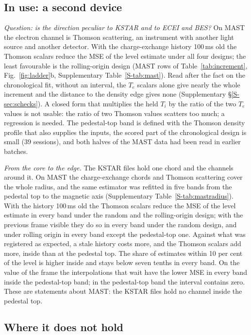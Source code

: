 \documentclass[11pt,a4paper]{article}
\newcommand{\Ti}{\ensuremath{T_i}}
\newcommand{\Te}{\ensuremath{T_e}}
\newcommand{\Supp}[1]{Supplementary \S\ref{S-#1}}
\newcommand{\SuppTab}[1]{Supplementary Table~\ref{S-#1}}
\begin{document}
\subsection{In use: a second device}
\label{sec:res:mast}

\emph{Question: is the direction peculiar to KSTAR and to ECEI and BES?} On MAST the
electron channel is Thomson scattering, an instrument with another light source and
another detector. With the charge-exchange history 100\,ms old the Thomson scalars reduce
the MSE of the level estimate under all four designs; the least favourable is the
rolling-origin design (MAST rows of Table~\ref{tab:increment}, Fig.~\ref{fig:ladder}b,
\SuppTab{tab:mast}). Read after the fact on the chronological fit, without an interval,
the \Te{} scalars alone give nearly the whole increment and the distance to the density
edge gives none (\Supp{sec:schecks}). A closed form that multiplies the held \Ti{} by the
ratio of the two \Te{} values is not usable: the ratio of two Thomson values scatters too
much; a regression is needed. The pedestal-top band is defined with the Thomson density
profile that also supplies the inputs, the scored part of the chronological design is
small (39 sessions), and both halves of the MAST data had been read in earlier batches.

\emph{From the core to the edge.} The KSTAR files hold one chord and the channels around
it. On MAST the charge-exchange chords and Thomson scattering cover the whole radius, and
the same estimator was refitted in five bands from the pedestal top to the magnetic axis
(\SuppTab{tab:mastradius}). With the history 100\,ms old the Thomson scalars reduce the MSE
of the level estimate in every band under the random and the rolling-origin design; with
the previous frame visible they do so in every band under the random design, and under
rolling origin in every band except the pedestal-top one. Against what was registered as
expected, a stale history costs more, and the Thomson scalars add more, inside than at the
pedestal top. The share of estimates within 10 per cent of the level is higher inside and
stays below seven tenths in every band. On the value of the frame the interpolations that
wait have the lower MSE in every band inside the pedestal-top band; in the pedestal-top
band the interval contains zero. These are statements about MAST: the KSTAR files hold no
channel inside the pedestal top.

\subsection{Where it does not hold}
\label{sec:res:limits}
\end{document}
